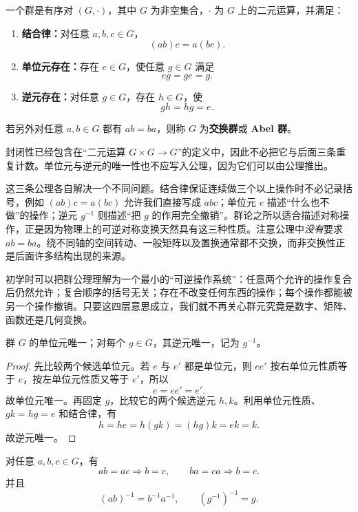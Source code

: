 \begin{definition}[群]
一个群是有序对 $(G,\cdot)$，其中 $G$ 为非空集合，$\cdot$ 为 $G$ 上的二元运算，并满足：
\begin{enumerate}[label=(\roman*),leftmargin=3em]
  \item \textbf{结合律：}对任意 $a,b,c\in G$，
  \[
  (ab)c=a(bc).
  \]
  \item \textbf{单位元存在：}存在 $e\in G$，使任意 $g\in G$ 满足
  \[
  eg=ge=g.
  \]
  \item \textbf{逆元存在：}对任意 $g\in G$，存在 $h\in G$，使
  \[
  gh=hg=e.
  \]
\end{enumerate}
若另外对任意 $a,b\in G$ 都有 $ab=ba$，则称 $G$ 为\textbf{交换群}或 \textbf{Abel 群}。
\label{def:group}
\end{definition}

封闭性已经包含在“二元运算 $G\times G\to G$”的定义中，因此不必把它与后面三条重复计数。单位元与逆元的唯一性也不应写入公理，因为它们可以由公理推出。

这三条公理各自解决一个不同问题。结合律保证连续做三个以上操作时不必记录括号，例如 $(ab)c=a(bc)$ 允许我们直接写成 $abc$；单位元 $e$ 描述“什么也不做”的操作；逆元 $g^{-1}$ 则描述“把 $g$ 的作用完全撤销”。群论之所以适合描述对称操作，正是因为物理上的可逆对称变换天然具有这三种性质。注意公理中\emph{没有}要求 $ab=ba$。绕不同轴的空间转动、一般矩阵以及置换通常都不交换，而非交换性正是后面许多结构出现的来源。

初学时可以把群公理理解为一个最小的“可逆操作系统”：任意两个允许的操作复合后仍然允许；复合顺序的括号无关；存在不改变任何东西的操作；每个操作都能被另一个操作撤销。只要这四层意思成立，我们就不再关心群元究竟是数字、矩阵、函数还是几何变换。

\begin{proposition}[单位元与逆元的唯一性]
群 $G$ 的单位元唯一；对每个 $g\in G$，其逆元唯一，记为 $g^{-1}$。
\label{prop:identity-inverse-unique}

\end{proposition}

\begin{proof}
先比较两个候选单位元。若 $e$ 与 $e'$ 都是单位元，则 $ee'$ 按右单位元性质等于 $e$，按左单位元性质又等于 $e'$，所以
\[
e=e e'=e'.
\]
故单位元唯一。再固定 $g$，比较它的两个候选逆元 $h,k$。利用单位元性质、$gk=hg=e$ 和结合律，有
\[
h=h e=h(gk)=(hg)k=e k=k.
\]
故逆元唯一。
\end{proof}

\begin{proposition}[消去律与逆元公式]
对任意 $a,b,c\in G$，有
\[
ab=ac\Longrightarrow b=c,
\qquad
ba=ca\Longrightarrow b=c.
\]
并且
\[
(ab)^{-1}=b^{-1}a^{-1},
\qquad
(g^{-1})^{-1}=g.
\]
\label{prop:cancellation-inverse}

\end{proposition}


